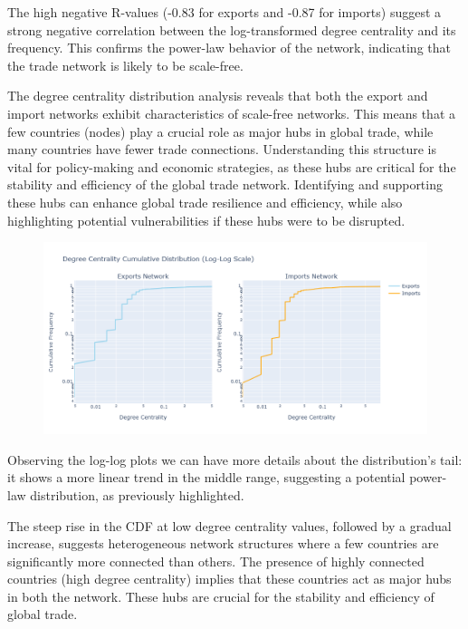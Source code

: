 \documentclass[12pt, a4paper]{article}
\begin{document}
The high negative R-values (-0.83 for exports and -0.87 for imports) suggest a strong negative correlation between the log-transformed degree centrality and its frequency. This confirms the power-law behavior of the network, indicating that the trade network is likely to be scale-free.

The degree centrality distribution analysis reveals that both the export and import networks exhibit characteristics of scale-free networks. This means that a few countries (nodes) play a crucial role as major hubs in global trade, while many countries have fewer trade connections. Understanding this structure is vital for policy-making and economic strategies, as these hubs are critical for the stability and efficiency of the global trade network. Identifying and supporting these hubs can enhance global trade resilience and efficiency, while also highlighting potential vulnerabilities if these hubs were to be disrupted.
\begin{figure}[ht]
\centering
\includegraphics[scale=0.4]{img/degreecum.png}
\label{fig:degreedist}
\end{figure}
Observing the log-log plots we can have more details about the distribution's tail: it shows a more linear trend in the middle range, suggesting a potential power-law distribution, as previously highlighted.

The steep rise in the CDF at low degree centrality values, followed by a gradual increase, suggests heterogeneous network structures where a few countries are significantly more connected than others. The presence of highly connected countries (high degree centrality) implies that these countries act as major hubs in both the network. These hubs are crucial for the stability and efficiency of global trade.
\end{document}
